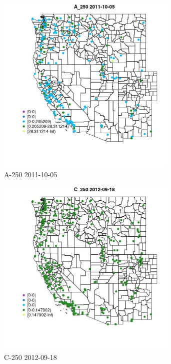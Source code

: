 \clearpage 

\begin{figure} 
\centering  
\includegraphics[width=0.77\textwidth]{Code_Outputs/ML_input_report_ML_input_PM25_Step5_part_d_de_duplicated_aves_ML_input_MapObsA_2502011-10-05.jpg} 
\caption{\label{fig:ML_input_report_ML_input_PM25_Step5_part_d_de_duplicated_aves_ML_inputMapObsA_2502011-10-05}A-250 2011-10-05} 
\end{figure} 
 

\begin{figure} 
\centering  
\includegraphics[width=0.77\textwidth]{Code_Outputs/ML_input_report_ML_input_PM25_Step5_part_d_de_duplicated_aves_ML_input_MapObsC_2502012-09-18.jpg} 
\caption{\label{fig:ML_input_report_ML_input_PM25_Step5_part_d_de_duplicated_aves_ML_inputMapObsC_2502012-09-18}C-250 2012-09-18} 
\end{figure} 
 

